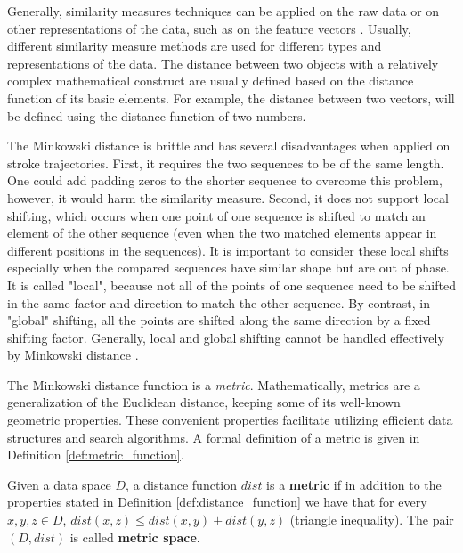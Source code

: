 \iftoggle{edit-mode}{\hspace{0pt}\marginpar{Different Representations}}{}
Generally, similarity measures techniques can be applied on the raw data or on other representations of the data, such as on the feature vectors \cite{chen2005similarity}. 
Usually, different similarity measure methods are used for different types and representations of the data. 
The distance between two objects with a relatively complex mathematical construct are usually defined based on the distance function of its basic elements. 
For example, the distance between two vectors, will be defined using the distance function of two numbers. 

\iftoggle{edit-mode}{\hspace{0pt}\marginpar{Drawbacks of the Minkowski distance}}{}
The Minkowski distance is brittle and has several disadvantages when applied on stroke trajectories.
First, it requires the two sequences to be of the same length. 
One could add padding zeros to the shorter sequence to overcome this problem, however, it would harm the similarity measure. 
Second, it does not support local shifting, which occurs when one point of one sequence is shifted to match an element of the other sequence (even when the two matched elements appear in different positions in the sequences). 
It is important to consider these local shifts especially when the compared sequences have similar shape but are out of phase. 
It is called "local", because not all of the points of one sequence need to be shifted in the same factor and direction to match the other sequence. 
By contrast, in "global" shifting, all the points are shifted along the same direction by a fixed shifting factor. 
Generally, local and global shifting cannot be handled effectively by Minkowski distance \cite{chen2005similarity}.

\iftoggle{edit-mode}{\hspace{0pt}\marginpar{Metric Definition}}{}
The Minkowski distance function is a \emph{metric}. Mathematically, metrics are a generalization of the Euclidean distance, keeping some of its well-known geometric properties. 
These convenient properties facilitate utilizing efficient data structures and search algorithms. A formal definition of a metric is given in Definition \ref{def:metric_function}.

\begin{definition}
Given a data space $D$, a distance function $dist$ is a \textbf{metric} if in addition to the properties stated in Definition \ref{def:distance_function} we have that for every $x,y,z \in D$, $dist(x,z) \leq dist(x,y) + dist(y,z)$ (triangle inequality). The pair $(D,dist)$ is called \textbf{metric space}.
\label{def:metric_function}
\end{definition}

